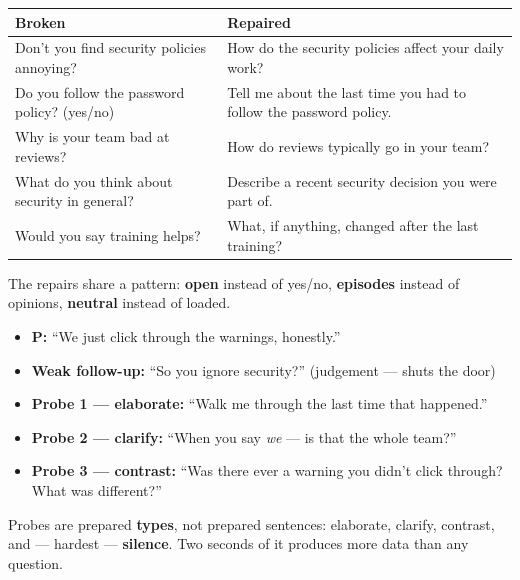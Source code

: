 \documentclass[11pt,a4paper,british,twoside=false,headings=small,chapterprefix=false,numbers=noenddot]{scrbook}
\begin{document}
\begin{center}\small
\footnotesize
  \renewcommand{\arraystretch}{1.35}
  \begin{tabular}{@{}p{6.3cm}p{6.7cm}@{}}
    \toprule
    \textbf{Broken} & \textbf{Repaired}\\
    \midrule
    Don't you find security policies annoying? & How do the security policies affect your daily work?\\
    Do you follow the password policy? (yes/no) & Tell me about the last time you had to follow the password policy.\\
    Why is your team bad at reviews? & How do reviews typically go in your team?\\
    What do you think about security in general? & Describe a recent security decision you were part of.\\
    Would you say training helps? & What, if anything, changed after the last training?\\
    \bottomrule
  \end{tabular}
  

  The repairs share a pattern: \textbf{open} instead of yes/no,
  \textbf{episodes} instead of opinions, \textbf{neutral} instead of loaded.
\end{center}

\begin{center}\small
\small
  \begin{itemize}\setlength{\itemsep}{0.45em}
    \item[] \textbf{P:} ``We just click through the warnings, honestly.''
    \item[] \textbf{Weak follow-up:} ``So you ignore security?''
          {\color{kgrey}(judgement --- shuts the door)}
    \item[] \textbf{Probe 1 --- elaborate:} ``Walk me through the last time
          that happened.''
    \item[] \textbf{Probe 2 --- clarify:} ``When you say \emph{we} --- is
          that the whole team?''
    \item[] \textbf{Probe 3 --- contrast:} ``Was there ever a warning you
          didn't click through? What was different?''
  \end{itemize}
  
  Probes are prepared \textbf{types}, not prepared sentences: elaborate,
  clarify, contrast, and --- hardest --- \textbf{silence}. Two seconds of it
  produces more data than any question.
\end{center}
\end{document}
